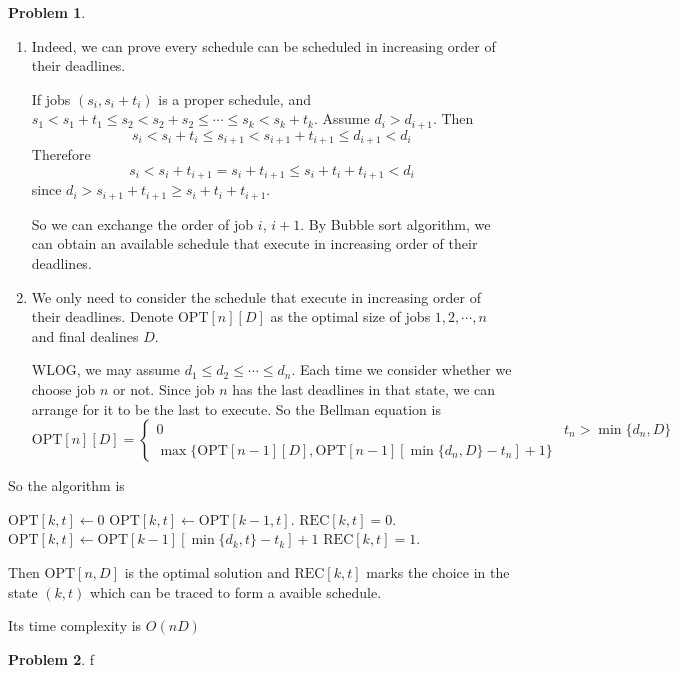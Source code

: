 \documentclass[a4paper]{article}
\theoremstyle{definition}
\newtheorem{problem}{Problem}
\theoremstyle{plain}
\newcommand{\OPT}{\mathrm{OPT}}
\numberwithin{equation}{problem}
\begin{document}
\begin{problem}
    \begin{enumerate}[label=(\alph*)]
        \item Indeed, we can prove every schedule can be scheduled in increasing order of their deadlines.
        
        If jobs  $ (s_i,s_i+t_i) $ is a proper schedule, and  $ s_1<s_1+t_1 \leq s_2<s_2+s_2 \leq \cdots \leq s_k<s_k+t_k $. Assume  $ d_i>d_{i+1} $. Then 
        \[s_i<s_i+t_i \leq s_{i+1}<s_{i+1}+t_{i+1} \leq d_{i+1}<d_i\]
        Therefore
        \[s_i<s_i+t_{i+1}=s_i+t_{i+1} \leq s_i+t_i+t_{i+1}<d_i\]
        since  $ d_i>s_{i+1}+t_{i+1} \geq s_i+t_i+t_{i+1} $.
        
        So  we can exchange the order of job  $ i $, $ i+1 $. By Bubble sort algorithm, we can obtain an available schedule that execute in increasing order of their deadlines.

        \item We only need to consider the schedule that execute in increasing order of their deadlines.
        Denote  $ \OPT[n][D] $ as the optimal size of jobs $ 1,2,\cdots,n $  and final dealines  $ D $.

        WLOG, we may assume  $ d_1 \leq d_2 \leq \cdots \leq d_n $.
        Each time we consider whether we choose job  $ n $ or not. Since job  $ n $ has the last deadlines in that state, we can arrange for it to be the last to   execute. So the Bellman equation is 
        \[\OPT[n][D]=\begin{cases}
            0&t_n>\min\{d_n,D\}\\
            \max\{\OPT[n-1][D],\OPT[n-1][\min\{d_n,D\}-t_n]+1\}
        \end{cases}\]  
    \end{enumerate}
    So the algorithm is 
    
    \begin{algorithm}
        \caption{$ \OPT $}
        \begin{algorithmic}[1]
            \STATE $ \OPT[k,t]\leftarrow0 $  \ENDIF 
            \STATE  $ \OPT[k,t]\leftarrow \OPT[k-1,t] $.
            \STATE  $ \mathrm{REC}[k,t]=0 $.
            \IF{ $ \OPT[k,t]<\OPT[k-1][\min\{d_k,t\}-t_k]+1 $ }
                \STATE     $ \OPT[k,t]\leftarrow\OPT[k-1][\min\{d_k,t\}-t_k]+1 $
                \STATE  $ \mathrm{REC}[k,t]=1 $.
            \ENDIF 
            \ENDFOR
        \end{algorithmic}
    \end{algorithm}


    Then  $ \OPT[n,D] $ is the optimal solution and  $ \mathrm{REC}[k,t] $ marks the choice in the state  $ (k,t) $ which can be traced to form a avaible schedule.
    
    Its time complexity is  $ O(nD) $ 
\end{problem}
\begin{problem}
    f
\end{problem}
\end{document}
